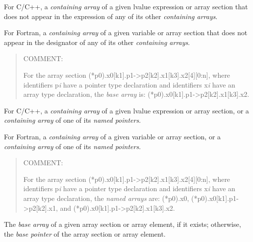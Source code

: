 \glossarydefstart
For C/C++, a \emph{containing array} of a given lvalue expression or 
array section that does not appear in the expression of any of its 
other \emph{containing arrays}.

For Fortran, a \emph{containing array} of a given variable or array section
that does not appear in the designator of any of its other 
\emph{containing arrays}.

\begin{quote}
COMMENT: 

For the array section
(*p0).x0[k1].p1->p2[k2].x1[k3].x2[4][0:n],
where identifiers p\emph{i} have a pointer type declaration
and identifiers x\emph{i} have an array type declaration, 
the \emph{base array} is: (*p0).x0[k1].p1->p2[k2].x1[k3].x2.
\end{quote}
\glossarydefend

\glossarydefstart
For C/C++, a \emph{containing array} of a given lvalue expression or array 
section, or a \emph{containing array} of one of its \emph{named pointers}.

For Fortran, a \emph{containing array} of a given variable or array section, or
a \emph{containing array} of one of its \emph{named pointers}.

\begin{quote}
COMMENT: 

For the array section
(*p0).x0[k1].p1->p2[k2].x1[k3].x2[4][0:n],
where identifiers p\emph{i} have a pointer type declaration
and identifiers x\emph{i} have an array type declaration, 
the \emph{named arrays} are:
(*p0).x0,
    (*p0).x0[k1].p1->p2[k2].x1,
and 
(*p0).x0[k1].p1->p2[k2].x1[k3].x2.
\end{quote}

\glossarydefend

\glossarydefstart
The \emph{base array} of a given array section or array element, if
it exists; otherwise, the \emph{base pointer} of the array section or array
element.

